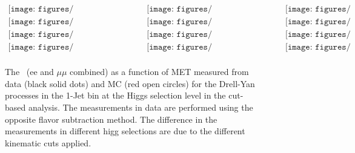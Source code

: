 \begin{figure}[!htbp]
\begin{center}$
\begin{array}{cccc}
\texttt{[image: figures/Routin\_1Jet\_mH115\_4000pb\_dy.pdf]} & 
\texttt{[image: figures/Routin\_1Jet\_mH120\_4000pb\_dy.pdf]} & 
\texttt{[image: figures/Routin\_1Jet\_mH130\_4000pb\_dy.pdf]} \\
\texttt{[image: figures/Routin\_1Jet\_mH140\_4000pb\_dy.pdf]} & 
\texttt{[image: figures/Routin\_1Jet\_mH150\_4000pb\_dy.pdf]} &
\texttt{[image: figures/Routin\_1Jet\_mH160\_4000pb\_dy.pdf]}  \\
\texttt{[image: figures/Routin\_1Jet\_mH170\_4000pb\_dy.pdf]} &
\texttt{[image: figures/Routin\_1Jet\_mH180\_4000pb\_dy.pdf]} & 
\texttt{[image: figures/Routin\_1Jet\_mH190\_4000pb\_dy.pdf]} \\
\texttt{[image: figures/Routin\_1Jet\_mH200\_4000pb\_dy.pdf]} &
\texttt{[image: figures/Routin\_1Jet\_mH250\_4000pb\_dy.pdf]} &
\texttt{[image: figures/Routin\_1Jet\_mH300\_4000pb\_dy.pdf]} \\
\end{array}$
\caption{ The \routin\, (ee and $\mu\mu$ combined) as a function of MET measured from data (black solid dots) 
and MC (red open circles) for the Drell-Yan processes in the 1-Jet bin at the 
Higgs selection level in the cut-based analysis. 
The measurements in data are performed using the opposite flavor subtraction method. 
The difference in the \routin measurements in different higg selections are due to the 
different kinematic cuts applied. 
}
\label{fig:routin_1jet}
\end{center}
\end{figure}


